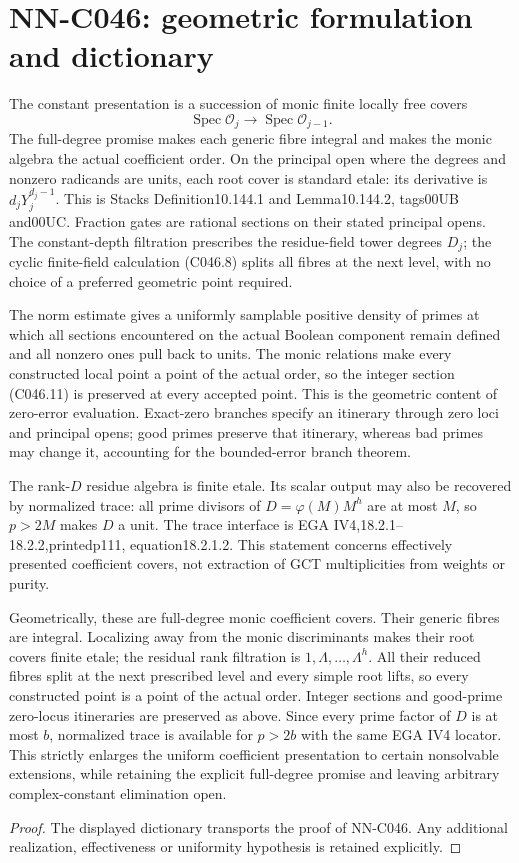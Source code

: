 \section{NN-C046: geometric formulation and dictionary}
\begin{geometricstatement}[NN-C046]
The constant presentation is a succession of monic finite locally
free covers
\[
 \operatorname{Spec}\mathcal O_j\longrightarrow
                         \operatorname{Spec}\mathcal O_{j-1}.
\]
The full-degree promise makes each generic fibre integral and makes
the monic algebra the actual coefficient order. On the principal
open where the degrees and nonzero radicands are units, each root
cover is standard etale: its derivative is $d_jY_j^{d_j-1}$.
This is Stacks Definition10.144.1 and Lemma10.144.2, tags00UB and00UC.
Fraction gates are rational sections on their stated principal
opens. The constant-depth filtration prescribes the residue-field
tower degrees $D_j$; the cyclic finite-field calculation (C046.8)
splits all fibres at the next level, with no choice of a preferred
geometric point required.

The norm estimate gives a uniformly samplable positive density of
primes at which all sections encountered on the actual Boolean
component remain defined and all nonzero ones pull back to units.
The monic relations make every constructed local point a point of
the actual order, so the integer section (C046.11) is preserved at
every accepted point. This is the geometric content of zero-error
evaluation. Exact-zero branches specify an itinerary through zero
loci and principal opens; good primes preserve that itinerary,
whereas bad primes may change it, accounting for the bounded-error
branch theorem.

The rank-$D$ residue algebra is finite etale. Its scalar output may
also be recovered by normalized trace: all prime divisors of
$D=\varphi(M)M^h$ are at most $M$, so $p>2M$ makes $D$ a unit.
The trace interface is EGA IV4,18.2.1--18.2.2,printedp111,
equation18.2.1.2. This statement concerns effectively presented
coefficient covers, not extraction of GCT multiplicities from
weights or purity.

Geometrically, these are full-degree monic coefficient covers.
Their generic fibres are integral. Localizing away from the monic
discriminants makes their root covers finite etale; the residual
rank filtration is $1,\Lambda,\ldots,\Lambda^h$. All their reduced
fibres split at the next prescribed level and every simple root
lifts, so every constructed point is a point of the actual order.
Integer sections and good-prime zero-locus itineraries are preserved
as above. Since every prime factor of $D$ is at most $b$, normalized
trace is available for $p>2b$ with the same EGA IV4 locator. This
strictly enlarges the uniform coefficient presentation to certain
nonsolvable extensions, while retaining the explicit full-degree
promise and leaving arbitrary complex-constant elimination open.
\end{geometricstatement}
\begin{proof} The displayed dictionary transports the proof of NN-C046. Any additional realization, effectiveness or uniformity hypothesis is retained explicitly.\end{proof}


